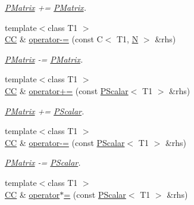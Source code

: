 \begin{DoxyCompactItemize}
\begin{DoxyCompactList}\small\item\em \mbox{\hyperlink{classENSEM_1_1PMatrix}{P\+Matrix}} += \mbox{\hyperlink{classENSEM_1_1PMatrix}{P\+Matrix}}. \end{DoxyCompactList}\item 
{\footnotesize template$<$class T1 $>$ }\\\mbox{\hyperlink{classENSEM_1_1PMatrix_a744bac549029029effe32dc1705660ec}{CC}} \& \mbox{\hyperlink{classENSEM_1_1PMatrix_a76fa178c64fa75b73925016654a08766}{operator-\/=}} (const C$<$ T1, \mbox{\hyperlink{adat__devel_2lib_2hadron_2operator__name__util_8cc_a7722c8ecbb62d99aee7ce68b1752f337}{N}} $>$ \&rhs)
\begin{DoxyCompactList}\small\item\em \mbox{\hyperlink{classENSEM_1_1PMatrix}{P\+Matrix}} -\/= \mbox{\hyperlink{classENSEM_1_1PMatrix}{P\+Matrix}}. \end{DoxyCompactList}\item 
{\footnotesize template$<$class T1 $>$ }\\\mbox{\hyperlink{classENSEM_1_1PMatrix_a744bac549029029effe32dc1705660ec}{CC}} \& \mbox{\hyperlink{classENSEM_1_1PMatrix_a141db586d4797230e05d41ab13c12a1e}{operator+=}} (const \mbox{\hyperlink{classENSEM_1_1PScalar}{P\+Scalar}}$<$ T1 $>$ \&rhs)
\begin{DoxyCompactList}\small\item\em \mbox{\hyperlink{classENSEM_1_1PMatrix}{P\+Matrix}} += \mbox{\hyperlink{classENSEM_1_1PScalar}{P\+Scalar}}. \end{DoxyCompactList}\item 
{\footnotesize template$<$class T1 $>$ }\\\mbox{\hyperlink{classENSEM_1_1PMatrix_a744bac549029029effe32dc1705660ec}{CC}} \& \mbox{\hyperlink{classENSEM_1_1PMatrix_ad33381d53cc105f6f64869316aa0e2c2}{operator-\/=}} (const \mbox{\hyperlink{classENSEM_1_1PScalar}{P\+Scalar}}$<$ T1 $>$ \&rhs)
\begin{DoxyCompactList}\small\item\em \mbox{\hyperlink{classENSEM_1_1PMatrix}{P\+Matrix}} -\/= \mbox{\hyperlink{classENSEM_1_1PScalar}{P\+Scalar}}. \end{DoxyCompactList}\item 
{\footnotesize template$<$class T1 $>$ }\\\mbox{\hyperlink{classENSEM_1_1PMatrix_a744bac549029029effe32dc1705660ec}{CC}} \& \mbox{\hyperlink{classENSEM_1_1PMatrix_a4c25aeda146eb61d41abf6cf625a6153}{operator$\ast$=}} (const \mbox{\hyperlink{classENSEM_1_1PScalar}{P\+Scalar}}$<$ T1 $>$ \&rhs)

\end{DoxyCompactItemize}
